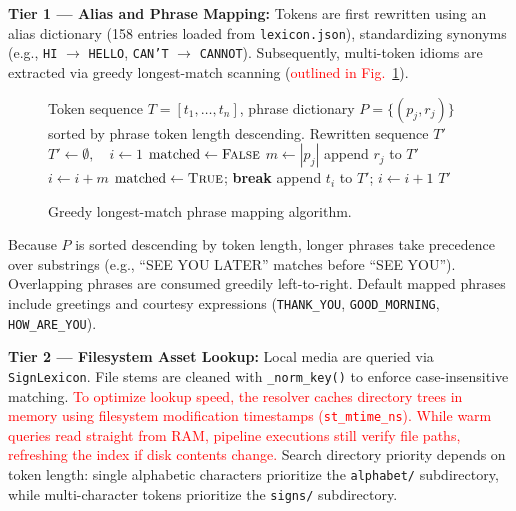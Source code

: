 \documentclass[conference,a4paper,10pt]{IEEEtran}
\begin{document}
\textbf{Tier 1 --- Alias and Phrase Mapping:} Tokens are first rewritten using an alias dictionary (158 entries loaded from \texttt{lexicon.json}), standardizing synonyms (e.g., \texttt{HI} $\rightarrow$ \texttt{HELLO}, \texttt{CAN'T} $\rightarrow$ \texttt{CANNOT}). Subsequently, multi-token idioms are extracted via greedy longest-match scanning (\textcolor{red}{outlined in Fig.~\ref{fig:phrase}}).

\begin{figure}[t]
\begin{algorithmic}[1]
\REQUIRE Token sequence $T = [t_1, \ldots, t_n]$, phrase dictionary $P = \{(p_j, r_j)\}$ sorted by phrase token length descending.
\ENSURE Rewritten sequence $T'$
\STATE $T' \gets \emptyset, \quad i \gets 1$
    \STATE $\mathrm{matched} \gets \textsc{False}$
        \STATE $m \gets |p_j|$
            \STATE append $r_j$ to $T'$
            \STATE $i \gets i + m$
            \STATE $\mathrm{matched} \gets \textsc{True}$; \textbf{break}
        \ENDIF
    \ENDFOR
        \STATE append $t_i$ to $T'$; \quad $i \gets i + 1$
    \ENDIF
\ENDWHILE
\RETURN $T'$
\end{algorithmic}
\caption{Greedy longest-match phrase mapping algorithm.}
\label{fig:phrase}
\end{figure}

Because $P$ is sorted descending by token length, longer phrases take precedence over substrings (e.g., ``SEE YOU LATER'' matches before ``SEE YOU''). Overlapping phrases are consumed greedily left-to-right. Default mapped phrases include greetings and courtesy expressions (\texttt{THANK\_YOU}, \texttt{GOOD\_MORNING}, \texttt{HOW\_ARE\_YOU}).

\textbf{Tier 2 --- Filesystem Asset Lookup:} Local media are queried via \texttt{SignLexicon}. File stems are cleaned with \texttt{\_norm\_key()} to enforce case-insensitive matching. \textcolor{red}{To optimize lookup speed, the resolver caches directory trees in memory using filesystem modification timestamps (\texttt{st\_mtime\_ns}). While warm queries read straight from RAM, pipeline executions still verify file paths, refreshing the index if disk contents change.} Search directory priority depends on token length: single alphabetic characters prioritize the \texttt{alphabet/} subdirectory, while multi-character tokens prioritize the \texttt{signs/} subdirectory.
\end{document}
